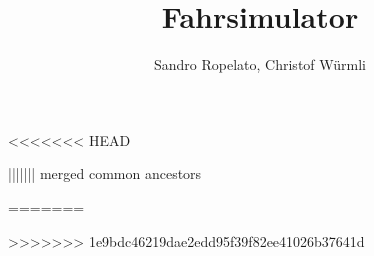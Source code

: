 \documentclass[a4paper,twoside,liststotocnumbered]{scrartcl}
\author{Sandro Ropelato, Christof Würmli}
\title{Fahrsimulator}
\begin{document}
	
	\tableofcontents
<<<<<<< HEAD
	\newpage
	
	
	\newpage
	
	\newpage
	
	\newpage
	
	\newpage
	
	\newpage
	
	\newpage
	
	\newpage
	
	\newpage
	
||||||| merged common ancestors
	\newpage
	
	\newpage
	
	\newpage
	
	\newpage
	
	\newpage
	
	\newpage
	
	\newpage
	
	\newpage
	
	\newpage
	
=======
	
	
	
	
	
	
	
	
	
>>>>>>> 1e9bdc46219dae2edd95f39f82ee41026b37641d
\end{document}
